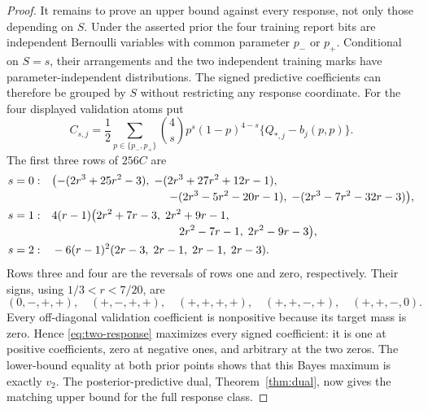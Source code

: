 \begin{proof}
It remains to prove an upper bound against every response, not only
those depending on $S$. Under the asserted prior the four training
report bits are independent Bernoulli variables with common parameter
$p_-$ or $p_+$. Conditional on $S=s$, their arrangements and the two
independent training marks have parameter-independent distributions.
The signed predictive coefficients can therefore be grouped by $S$
without restricting any response coordinate. For the four displayed
validation atoms put
\[
 C_{s,j}=\frac12\sum_{p\in\{p_-,p_+\}}
 {4\choose s}p^s(1-p)^{4-s}\{Q_{*,j}-b_j(p,p)\}.
\]
The first three rows of $256C$ are
\begin{align*}
 s=0:
 &\quad\bigl(-(2r^3+25r^2-3),\;-(2r^3+27r^2+12r-1),\bigr.\\[-2pt]
 &\hspace{40mm}\bigl.-(2r^3-5r^2-20r-1),\;-(2r^3-7r^2-32r-3)\bigr),\\
 s=1:
 &\quad4(r-1)\bigl(2r^2+7r-3,\;2r^2+9r-1,\\[-2pt]
 &\hspace{43mm}2r^2-7r-1,\;2r^2-9r-3\bigr),\\
 s=2:
 &\quad-6(r-1)^2(2r-3,\;2r-1,\;2r-1,\;2r-3).
\end{align*}
Rows three and four are the reversals of rows one and zero, respectively.
Their signs, using $1/3<r<7/20$, are
\[
 (0,-,+,+),\quad(+,-,+,+),\quad(+,+,+,+),\quad
 (+,+,-,+),\quad(+,+,-,0).
\]
Every off-diagonal validation coefficient is nonpositive because its
target mass is zero. Hence \eqref{eq:two-response} maximizes every signed
coefficient: it is one at positive coefficients, zero at negative ones,
and arbitrary at the two zeros. The lower-bound equality at both prior
points shows that this Bayes maximum is exactly $v_2$.
The posterior-predictive dual, Theorem~\ref{thm:dual}, now gives the
matching upper bound for the full response class.
\end{proof}


